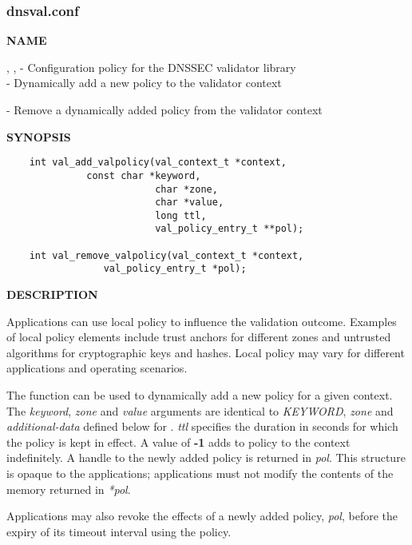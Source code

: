 \clearpage

\subsubsection{dnsval.conf}

{\bf NAME}

, ,  -
Configuration policy for the DNSSEC validator library \\
 - Dynamically add a new policy to the validator
context

 - Remove a dynamically added policy from the
validator context

{\bf SYNOPSIS}

\begin{verbatim}
    int val_add_valpolicy(val_context_t *context,
			  const char *keyword,
                          char *zone,
                          char *value,
                          long ttl,
                          val_policy_entry_t **pol);

    int val_remove_valpolicy(val_context_t *context,
			     val_policy_entry_t *pol);
\end{verbatim}

{\bf DESCRIPTION}

Applications can use local policy to influence the validation outcome.
Examples of local policy elements include trust anchors for different zones
and untrusted algorithms for cryptographic keys and hashes.  Local policy
may vary for different applications and operating scenarios.

The  function can be used to dynamically add a new
policy for a given context.  The {\it keyword}, {\it zone} and {\it value}
arguments are identical to {\it KEYWORD}, {\it zone} and {\it additional-data}
defined below for .  {\it ttl} specifies the duration in
seconds for which the policy is kept in effect.  A value of {\bf -1} adds to
policy to the context indefinitely.  A handle to the newly added policy is
returned in {\it *pol}.  This structure is opaque to the applications;
applications must not modify the contents of the memory returned in {\it
*pol}.

Applications may also revoke the effects of a newly added policy, {\it pol}, 
before the expiry of its timeout interval using the 
 policy.

